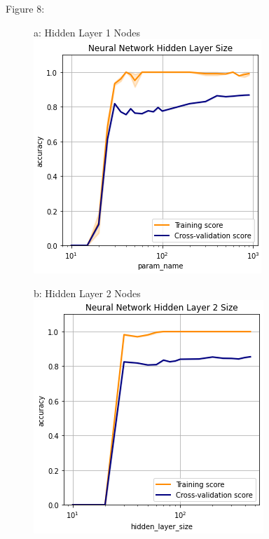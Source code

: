 \documentclass{article}
\begin{document}
\begin{figure}
	\centering
	Figure 8:\\
	\begin{subfigure}{.30\textwidth}
		\centering
		a: Hidden Layer 1 Nodes\\
		\includegraphics[width=\linewidth]{mnist_nn_hidden_layer_size.png}
		
	\end{subfigure}
	\begin{subfigure}{.30\textwidth}
		\centering
		b: Hidden Layer 2 Nodes\\
		\includegraphics[width=\linewidth]{mnist_nn_hidden_layer_2_size.png}
		

\end{subfigure}
\end{figure}
\end{document}
